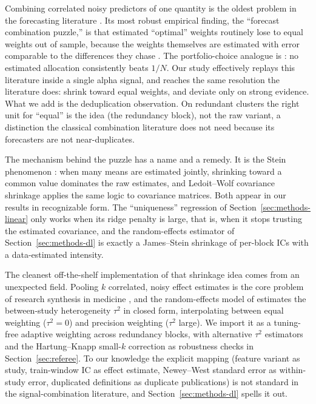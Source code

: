 \documentclass[11pt]{article}
\begin{document}
Combining correlated noisy predictors of one quantity is the oldest problem in the
forecasting literature \citep{bates1969,clemen1989,timmermann2006}. Its most robust
empirical finding, the ``forecast combination puzzle,'' is that estimated ``optimal''
weights routinely lose to equal weights out of sample, because the weights themselves are
estimated with error comparable to the differences they chase \citep{stock2004,smith2009}.
The portfolio-choice analogue is \citet{demiguel2009}: no estimated allocation consistently
beats $1/N$. Our study effectively replays this literature inside a single alpha signal,
and reaches the same resolution the literature does: shrink toward equal weights, and
deviate only on strong evidence. What we add is the deduplication observation. On redundant
clusters the right unit for ``equal'' is the idea (the redundancy block), not the raw
variant, a distinction the classical combination literature does not need because its
forecasters are not near-duplicates.

The mechanism behind the puzzle has a name and a remedy. It is the Stein phenomenon
\citep{james1961,efron1977}: when many means are estimated jointly, shrinking toward a
common value dominates the raw estimates, and Ledoit--Wolf covariance shrinkage
\citep{ledoit2004} applies the same logic to covariance matrices. Both appear in our results
in recognizable form. The ``uniqueness'' regression of Section~\ref{sec:methods-linear}
only works when its ridge penalty is large, that is, when it stops trusting the estimated
covariance, and the random-effects estimator of Section~\ref{sec:methods-dl} is exactly a
James--Stein shrinkage of per-block ICs with a data-estimated intensity.

The cleanest off-the-shelf implementation of that shrinkage idea comes from an unexpected
field. Pooling $k$ correlated, noisy effect estimates is the core problem of research
synthesis in medicine \citep{cochran1954,borenstein2010}, and the random-effects model of
\citet{dersimonian1986} estimates the between-study heterogeneity $\tau^2$ in closed form,
interpolating between equal weighting ($\tau^2=0$) and precision weighting ($\tau^2$
large). We import it as a tuning-free adaptive weighting across redundancy blocks, with
alternative $\tau^2$ estimators \citep{paule1982,harville1977,veroniki2016} and the
Hartung--Knapp small-$k$ correction \citep{hartung2001} as robustness checks in
Section~\ref{sec:referee}. To our knowledge the explicit mapping (feature variant as study,
train-window IC as effect estimate, Newey--West standard error as within-study error,
duplicated definitions as duplicate publications) is not standard in the signal-combination
literature, and Section~\ref{sec:methods-dl} spells it out.
\end{document}
